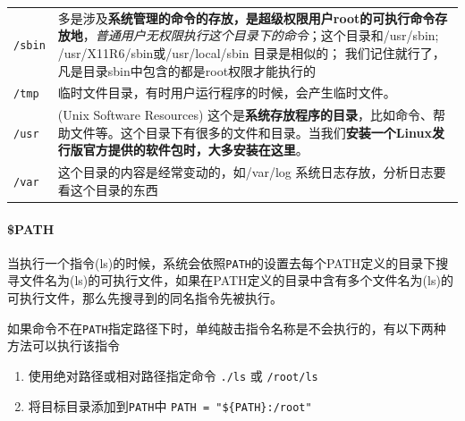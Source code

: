 \documentclass[UTF8,a4paper,12pt]{ctexbook}
\begin{document}
\begin{table}[H]
\begin{longtable}{l|m{14cm}}
							\verb|/sbin|		&	多是涉及\textbf{系统管理的命令的存放，是超级权限用户root的可执行命令存放地}，\textit{普通用户无权限执行这个目录下的命令}；这个目录和/usr/sbin; /usr/X11R6/sbin或/usr/local/sbin 目录是相似的； 我们记住就行了，凡是目录sbin中包含的都是root权限才能执行的			\\
							\verb|/tmp|		&	临时文件目录，有时用户运行程序的时候，会产生临时文件。			\\
							\verb|/usr|		& (Unix Software Resources)	这个是\textbf{系统存放程序的目录}，比如命令、帮助文件等。这个目录下有很多的文件和目录。当我们\textbf{安装一个Linux发行版官方提供的软件包时，大多安装在这里}。			\\
							\verb|/var |		&	这个目录的内容是经常变动的，如/var/log 系统日志存放，分析日志要看这个目录的东西\\
						\hline
				\end{longtable}
			\end{table}
			\paragraph{\$PATH}
				当执行一个指令(ls)的时候，系统会依照\verb|PATH|的设置去每个PATH定义的目录下搜寻文件名为(ls)的可执行文件，如果在PATH定义的目录中含有多个文件名为(ls)的可执行文件，那么先搜寻到的同名指令先被执行。
				
				如果命令不在\verb|PATH|指定路径下时，单纯敲击指令名称是不会执行的，有以下两种方法可以执行该指令
					\begin{enumerate}
						\item 使用绝对路径或相对路径指定命令 \verb|./ls| 或 \verb|/root/ls|
						\item 将目标目录添加到\verb|PATH|中 \verb|PATH = "${PATH}:/root"|
					\end{enumerate}
			
\end{document}
